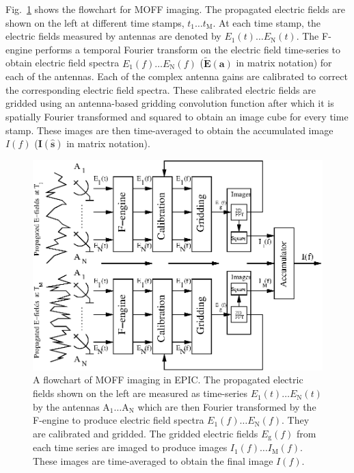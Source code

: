\documentclass[a4paper,fleqn,usenatbib]{mnras}
\begin{document}
Fig.~\ref{fig:MOFF-flowchart} shows the flowchart for MOFF imaging. The
propagated electric fields are shown on the left at different time stamps,
$t_1\ldots t_\textrm{M}$. At each time stamp, the electric fields measured by
antennas are denoted by $E_1(t)\ldots E_\textrm{N}(t)$. The F-engine performs a
temporal Fourier transform on the electric field time-series to obtain electric
field spectra $E_1(f)\ldots E_\textrm{N}(f)$ 
($\widetilde{\mathbf{E}}(\mathbf{a})$ in matrix notation) for each of the 
antennas. Each of the complex antenna gains are calibrated to correct the 
corresponding electric field spectra. These calibrated electric fields are 
gridded using an antenna-based gridding convolution function after which it is 
spatially Fourier transformed and squared to obtain an image cube for every time 
stamp. These images are then time-averaged to obtain the accumulated image 
$I(f)$ ($\mathbf{I}(\hat{\mathbf{s}})$ in matrix notation).
\begin{figure}
  \includegraphics[width=\columnwidth]{MOFF_flowchart}
  \caption{A flowchart of MOFF imaging in EPIC. The propagated electric fields
    shown on the left are measured as time-series $E_1(t)\ldots E_\textrm{N}(t)$
    by the antennas $\textrm{A}_1\ldots \textrm{A}_\textrm{N}$ which are then 
    Fourier transformed by the F-engine to produce electric field spectra 
    $E_1(f)\ldots E_\textrm{N}(f)$. They are calibrated and gridded. The gridded 
    electric fields $E_\textrm{g}(f)$ from each time series are imaged to produce 
    images $I_1(f)\ldots I_\textrm{M}(f)$. These images are time-averaged to 
    obtain the final image $I(f)$.}
  \label{fig:MOFF-flowchart}
\end{figure}
\end{document}
